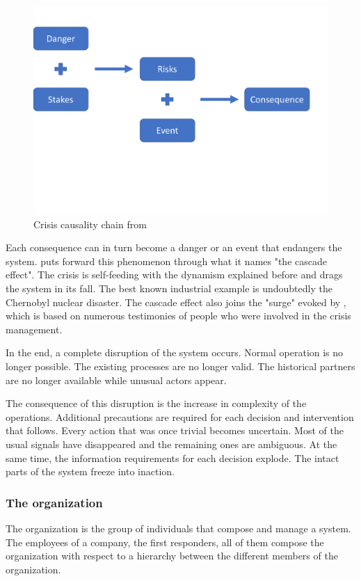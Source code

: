 \begin{figure}
    \centering
    \includegraphics[width=\textwidth]{figures/fred-consequences-framework.pdf}
    \caption{Crisis causality chain from \textcite{benabenCollaborativeSystemsCrisis2014}}
    \label{context:fred-framework}
\end{figure}

Each consequence can in turn become a danger or an event that endangers the system.
\textcite{fertierInterpretationAutomatiqueDonnees2018} puts forward this phenomenon through what it names "the cascade effect".
The crisis is self-feeding with the dynamism explained before and drags the system in its fall.
The best known industrial example is undoubtedly the Chernobyl nuclear disaster.
The cascade effect also joins the "surge" evoked by \textcite{lagadecGESTIONCRISES1994}, which is based on numerous testimonies of people who were involved in the crisis management.

In the end, a complete disruption of the system occurs.
Normal operation is no longer possible. The existing processes are no longer valid.
The historical partners are no longer available while unusual actors appear.

The consequence of this disruption is the increase in complexity of the operations.
Additional precautions are required for each decision and intervention that follows.
Every action that was once trivial becomes uncertain.
Most of the usual signals have disappeared and the remaining ones are ambiguous.
At the same time, the information requirements for each decision explode.
The intact parts of the system freeze into inaction.

\subsubsection{The organization}
The organization is the group of individuals that compose and manage a system.
The employees of a company, the first responders, all of them compose the organization with respect to a hierarchy between the different members of the organization.

